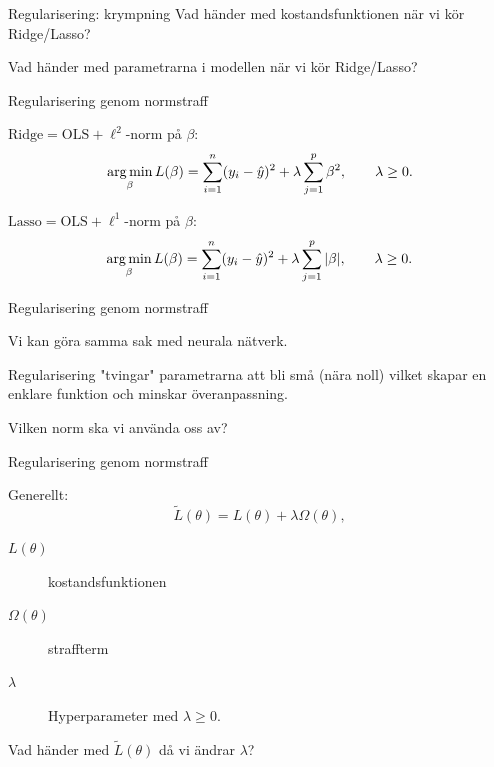 \documentclass[10pt,english]{beamer}
\begin{document}
\begin{frame}{Regularisering: krympning}
    Vad händer med kostandsfunktionen när vi kör Ridge/Lasso?
    
    Vad händer med parametrarna i modellen när vi kör Ridge/Lasso?

\end{frame}

\begin{frame}{Regularisering genom normstraff}
    
    $\text{Ridge} = \text{OLS} + \ell^2$-norm på $\beta$:
    \begin{equation*}
        \operatorname*{arg\,min}_{\beta} L(\beta) = \sum_{i=1}^{n}(y_i - \hat{y})^2 + \lambda \sum_{j=1}^{p} \beta^2, \qquad \lambda \geq 0.
    \end{equation*}


    $\text{Lasso} = \text{OLS} + \ell^1$-norm på $\beta$:
    \begin{equation*}
        \operatorname*{arg\,min}_{\beta} L(\beta) = \sum_{i=1}^{n}(y_i - \hat{y})^2 + \lambda \sum_{j=1}^{p} |\beta|, \qquad \lambda \geq 0.
    \end{equation*}
\end{frame}

\begin{frame}{Regularisering genom normstraff}
    
    Vi kan göra samma sak med neurala nätverk.

    Regularisering "tvingar" parametrarna att bli små (nära noll) vilket skapar en enklare funktion och minskar överanpassning.

    Vilken norm ska vi använda oss av?

\end{frame}

\begin{frame}{Regularisering genom normstraff}
    
    Generellt:
    \begin{equation*}
        \tilde{L}(\theta) = L(\theta) + \lambda \Omega(\theta),
    \end{equation*}
    \begin{description}
        \item[$L(\theta)$] kostandsfunktionen
        \item[$\Omega(\theta)$] straffterm
        \item[$\lambda$] Hyperparameter med $\lambda \geq 0$.   
    \end{description}

    Vad händer med  $\tilde{L}(\theta)$ då vi ändrar $\lambda$?

\end{frame}
\end{document}
